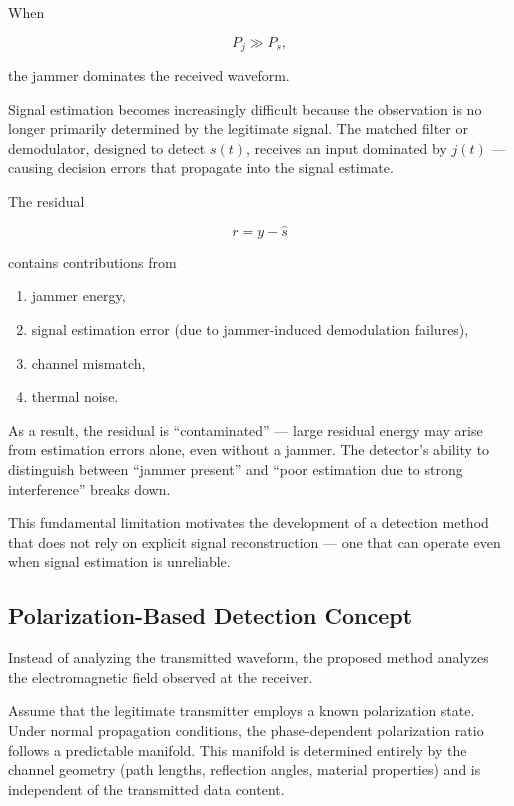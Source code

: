\documentclass{article}
\begin{document}
When

\begin{equation}
P_j \gg P_s,
\end{equation}

the jammer dominates the received waveform.

Signal estimation becomes increasingly difficult because the observation is no longer primarily determined by the legitimate signal. The matched filter or demodulator, designed to detect $s(t)$, receives an input dominated by $j(t)$ — causing decision errors that propagate into the signal estimate.

The residual

\begin{equation}
r=y-\hat{s}
\end{equation}

contains contributions from

\begin{enumerate}
\item jammer energy,
\item signal estimation error (due to jammer-induced demodulation failures),
\item channel mismatch,
\item thermal noise.
\end{enumerate}

As a result, the residual is ``contaminated'' — large residual energy may arise from estimation errors alone, even without a jammer. The detector's ability to distinguish between ``jammer present'' and ``poor estimation due to strong interference'' breaks down.

This fundamental limitation motivates the development of a detection method that does not rely on explicit signal reconstruction — one that can operate even when signal estimation is unreliable.

\subsection{Polarization-Based Detection Concept}

Instead of analyzing the transmitted waveform, the proposed method analyzes the electromagnetic field observed at the receiver.

Assume that the legitimate transmitter employs a known polarization state. Under normal propagation conditions, the phase-dependent polarization ratio follows a predictable manifold. This manifold is determined entirely by the channel geometry (path lengths, reflection angles, material properties) and is independent of the transmitted data content.
\end{document}
